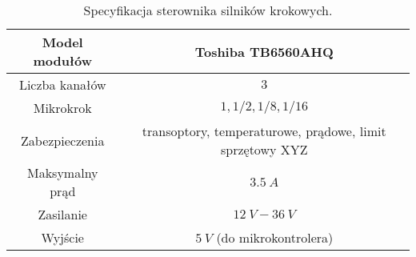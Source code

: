 \begin{table}
	[b]	\caption{Specyfikacja sterownika silników krokowych.}
	\label{tab:stepper_driver_spec}
	\centering
	\begin{tabular}{|c|c|}
		\hline
		Model modułów & Toshiba TB6560AHQ \\
		\hline
		Liczba kanałów & $\num{3}$ \\
		\hline
		Mikrokrok & $1,1/2,1/8,1/16$ \\
		\hline
		Zabezpieczenia &  transoptory, temperaturowe, prądowe, limit sprzętowy XYZ \\
		\hline
		Maksymalny prąd & $\SI{3.5}{A}$ \\
		\hline
		Zasilanie & $\SI{12}{V}-\SI{36}{V}$ \\
		\hline
		Wyjście & $\SI{5}{V}$ (do mikrokontrolera) \\
		\hline
	\end{tabular}
\end{table}